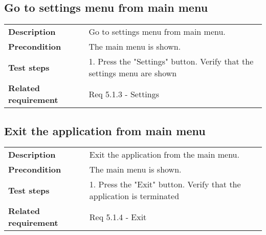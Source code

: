 \documentclass[a4paper,titlepage]{article}
\begin{document}
\subsection{Go to settings menu from main menu}
\begin{tabularx}{\textwidth}{lX}
	\textbf{Description}	&
		Go to settings menu from main menu.\\
	\textbf{Precondition}	&
		The main menu is shown.\\
	\textbf{Test steps}	&
		1.  Press the "Settings" button\newline
		2.  Verify that the settings menu are shown\\
	\textbf{Related requirement}	&
		Req 5.1.3 - Settings \\
\end{tabularx}

\subsection{Exit the application from main menu}
\begin{tabularx}{\textwidth}{lX}
	\textbf{Description}	&
		Exit the application from the main menu.\\
	\textbf{Precondition}	&
		The main menu is shown.\\
	\textbf{Test steps}	&
		1.  Press the "Exit" button\newline
		2.  Verify that the application is terminated\\
	\textbf{Related requirement}	&
		Req 5.1.4 - Exit \\
\end{tabularx}
\end{document}
